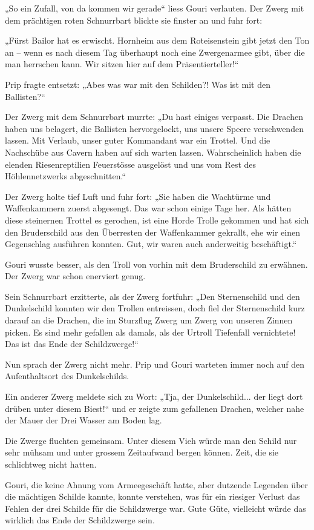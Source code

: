 „So ein Zufall, von da kommen wir gerade“ liess Gouri verlauten. Der Zwerg mit dem prächtigen roten Schnurrbart blickte sie finster an und fuhr fort:

„Fürst Bailor hat es erwischt. Hornheim aus dem Roteisenstein gibt jetzt den Ton an – wenn es nach diesem Tag überhaupt noch eine Zwergenarmee gibt, über die man herrschen kann. Wir sitzen hier auf dem Präsentierteller!“

Prip fragte entsetzt: „Abes was war mit den Schilden?! Was ist mit den Ballisten?“

Der Zwerg mit dem Schnurrbart murrte: „Du hast einiges verpasst. Die Drachen haben uns belagert, die Ballisten hervorgelockt, uns unsere Speere verschwenden lassen. Mit Verlaub, unser guter Kommandant war ein Trottel. Und die Nachschübe aus Cavern haben auf sich warten lassen. Wahrscheinlich haben die elenden Riesenreptilien Feuerstösse ausgelöst und uns vom Rest des Höhlennetzwerks abgeschnitten.“

Der Zwerg holte tief Luft und fuhr fort: „Sie haben die Wachtürme und Waffenkammern zuerst abgesengt. Das war schon einige Tage her. Als hätten diese steinernen Trottel es gerochen, ist eine Horde Trolle gekommen und hat sich den Bruderschild aus den Überresten der Waffenkammer gekrallt, ehe wir einen Gegenschlag ausführen konnten. Gut, wir waren auch anderweitig beschäftigt.“

Gouri wusste besser, als den Troll von vorhin mit dem Bruderschild zu erwähnen. Der Zwerg war schon enerviert genug.

Sein Schnurrbart erzitterte, als der Zwerg fortfuhr: „Den Sternenschild und den Dunkelschild konnten wir den Trollen entreissen, doch fiel der Sternenschild kurz darauf an die Drachen, die im Sturzflug Zwerg um Zwerg von unseren Zinnen picken. Es sind mehr gefallen als damals, als der Urtroll Tiefenfall vernichtete! Das ist das Ende der Schildzwerge!“

Nun sprach der Zwerg nicht mehr. Prip und Gouri warteten immer noch auf den Aufenthaltsort des Dunkelschilds.

Ein anderer Zwerg meldete sich zu Wort: „Tja, der Dunkelschild... der liegt dort drüben unter diesem Biest!“ und er zeigte zum gefallenen Drachen, welcher nahe der Mauer der Drei Wasser am Boden lag.

Die Zwerge fluchten gemeinsam. Unter diesem Vieh würde man den Schild nur sehr mühsam und unter grossem Zeitaufwand bergen können. Zeit, die sie schlichtweg nicht hatten.

Gouri, die keine Ahnung vom Armeegeschäft hatte, aber dutzende Legenden über die mächtigen Schilde kannte, konnte verstehen, was für ein riesiger Verlust das Fehlen der drei Schilde für die Schildzwerge war. Gute Güte, vielleicht würde das wirklich das Ende der Schildzwerge sein.

